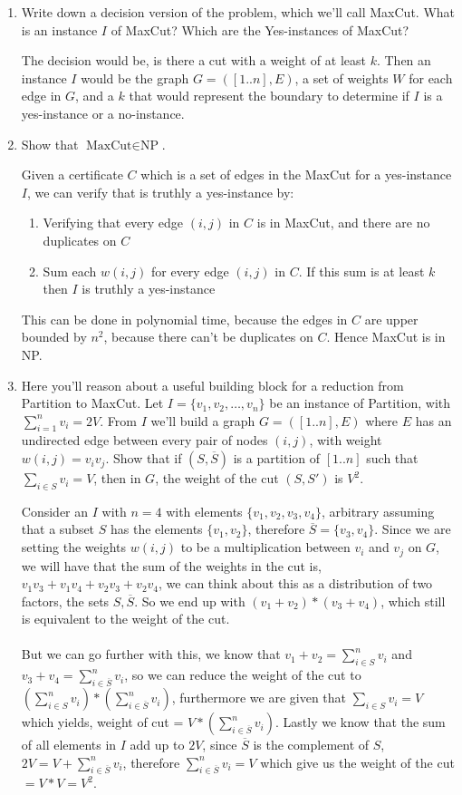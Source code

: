 \documentclass[11pt]{article}
\def\question#1{\red{#1}}
\def\soln#1{\par\blu{#1}} %
\def\blu#1{{\color{blu}#1}}
\def\red#1{{\color{red}#1}}
\begin{document}
\begin{enumerate}
\item \question{Write down a decision version of the problem, which
we'll call MaxCut. What is an instance $I$ of MaxCut? Which are the
Yes-instances of MaxCut?}
\soln{
   The decision would be, is there a cut with a weight of at least $k$. Then an instance $I$ 
   would be the graph $G=([1..n],E)$, a set of weights $W$ for each edge in $G$, and a $k$ 
   that would represent the boundary to determine if $I$ is a yes-instance or a no-instance.
}

\item \question{Show that $\text{MaxCut} \in \text{NP}$.}
\soln{
   Given a certificate $C$ which is a set of edges in the MaxCut for a yes-instance $I$, 
   we can verify that is truthly a yes-instance by: 
   \begin{enumerate}
      \item Verifying that every edge $(i,j)$ in $C$ is in MaxCut, and there are no duplicates on $C$
      \item Sum each $w(i,j)$ for every edge $(i,j)$ in $C$. If this sum is at least $k$ then 
      $I$ is truthly a yes-instance
   \end{enumerate}
   This can be done in polynomial time, because the edges in $C$ are upper bounded by $n^2$, because 
   there can't be duplicates on $C$. Hence MaxCut is in NP.
}

\item Here you'll reason about a useful building block for a reduction
from Partition to MaxCut.
Let $I = \{v_1,v_2,\ldots,v_n\}$ be an instance of Partition, with
$\sum_{i=1}^n v_i = 2V$.  From $I$ we'll build a graph $G =
   ([1..n], E)$ where $E$ has an undirected edge between every pair of
nodes $(i,j)$, with weight $w(i,j) = v_i v_j$.
\question{Show that if $(S, \overline{S})$ is a partition of $[1..n]$ such that
$\sum_{i\in S} v_i = V$, then in $G$, the weight of the cut $(S,S')$
is $V^2$.}
\soln{
   Consider an $I$ with $n=4$ with elements $\{v_1, v_2, v_3, v_4 \}$, arbitrary assuming that a subset $S$ has 
   the elements $\{ v_1, v_2 \}$, therefore $\overline{S} = \{ v_3, v_4\}$. Since we are setting the 
   weights $w(i,j)$ to be a multiplication between $v_i$ and $v_j$ on $G$, we will have that the sum of 
   the weights in the cut is, $v_1v_3 + v_1v_4 + v_2v_3 + v_2v_4$, we can think about this as a 
   distribution of two factors, the sets $S, \overline{S}$. So we end up with $(v_1+v_2) * (v_3+v_4)$, which 
   still is equivalent to the weight of the cut. \\ \\
   But we can go further with this, we know that $v_1+v_2 = \sum_{i \in S}^n v_i$ and
   $v_3+v_4 = \sum_{i \in \overline{S}}^n v_i$, so we can reduce the weight of the cut to 
   $(\sum_{i \in S}^n v_i) * (\sum_{i \in \overline{S}}^n v_i)$, furthermore we are given that 
   $\sum_{i\in S} v_i = V$ which yields, weight of cut = $V * (\sum_{i \in \overline{S}}^n v_i)$. Lastly 
   we know that the sum of all elements in $I$ add up to $2V$, since $\overline{S}$ is the complement 
   of $S$, $2V = V + \sum_{i \in \overline{S}}^n v_i$, therefore $ \sum_{i \in \overline{S}}^n v_i = V$
   which give us the weight of the cut $ = V*V = V^2$.
}


\end{enumerate}
\end{document}
